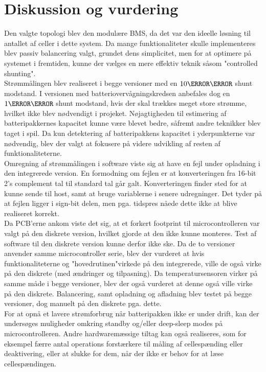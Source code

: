 \chapter{Diskussion og vurdering}\label{kap:diskussion}
Den valgte topologi blev den modulære BMS, da det var den ideelle løsning til antallet af celler i dette system. Da mange funktionaliteter skulle implementeres blev passiv balancering valgt, grundet dens simplicitet, men for at optimere på systemet i fremtiden, kunne der vælges en mere effektiv teknik såsom "controlled shunting". \\ 

Strømmålingen blev realiseret i begge versioner med en $10\milli\ohm$ shunt modstand. I versionen med batteriovervågningskredsen anbefales dog en $1\milli\ohm$ shunt modstand, hvis der skal trækkes meget store strømme, hvilket ikke blev nødvendigt i projeket. Nøjagtigheden til estimering af batteripakkernes kapacitet kunne være blevet bedre, såfremt andre teknikker blev taget i spil. Da kun detektering af batteripakkens kapacitet i yderpunkterne var nødvendig, blev der valgt at fokusere på videre udvikling af resten af funktionaliteterne. \\

Omregning af strømmålingen i software viste sig at have en fejl under opladning i den integrerede version. En formodning om fejlen er at konverteringen fra 16-bit 2's complement tal til standard tal går galt. Konverteringen finder sted for at kunne sende til host, samt at bruge variablerne i senere udregninger. Det tyder på at fejlen ligger i sign-bit delen, men pga. tidspres nåede dette ikke at blive realiseret korrekt. \\

Da PCB'erne ankom viste det sig, at et forkert footprint til microcontrolleren var valgt på den diskrete version, hvilket gjorde at den ikke kunne monteres. Test af software til den diskrete version kunne derfor ikke ske. Da de to versioner anvender samme microcontroller serie, blev der vurderet at hvis funktionaliteterne og "hovedrutinen"\space virkede på den integrerede, ville de også virke på den diskrete (med ændringer og tilpasning). Da temperatursensoren virker på samme måde i begge versioner, blev der også vurderet at denne også ville virke på den diskrete. Balancering, samt opladning og afladning blev testet på begge versioner, dog manuelt på den diskrete pga. dette. \\

For at opnå et lavere strømforbrug når batteripakken ikke er under drift, kan der undersøges muligheder omkring standby og/eller deep-sleep modes på microcontrolleren. Andre hardwaremæssige tiltag kan også realiseres, som for eksempel færre antal operations forstærkere til måling af cellespænding eller deaktivering, eller at slukke for dem, når der ikke er behov for at læse cellespændingen. \\
